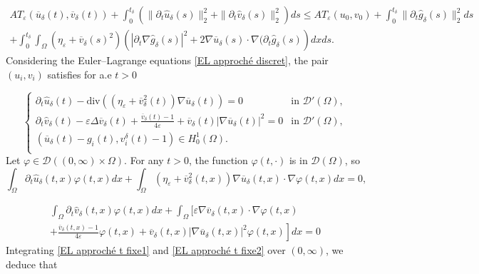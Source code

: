 \documentclass[reqno,12pt,twoside]{amsart}
\numberwithin{equation}{section} \numberwithin{theorem}{section}
\numberwithin{proposition}{section} \numberwithin{lemma}{section}
\numberwithin{corollary}{section}
\numberwithin{definition}{section} \numberwithin{remark}{section}
\begin{document}
\begin{multline}\label{energy bound continue}
AT_\varepsilon (\overline{u}_\delta (t) , \overline{v}_\delta (t)) + \int_0^{t_\delta} \left(\|\partial_t \hat{u}_\delta(s)\|_2^2 + \|\partial_t \hat{v}_\delta(s)\|_2^2 \right)ds 
\leqslant AT_\varepsilon (u_0 , v_0) + \int_0^{t_\delta} \|\partial_t \hat{g}_\delta (s)\|_2^2 ds\\
+ \int_0^{t_\delta}\int_\Omega (\eta_\varepsilon + \overline{v}_\delta(s)^2)\left(|\partial_t \nabla \hat{g}_\delta (s)|^2 + 2 \nabla \overline{u}_\delta (s)\cdot \nabla (\partial_t \hat{g}_\delta (s)\right) dx ds.
\end{multline}
Considering the Euler--Lagrange equations \eqref{EL approché discret},  the pair $(u_i, v_i)$ satisfies for a.e $t >0$

\begin{equation}\label{EL approché t fixe}
\left\{\begin{array}{ll}
\partial_t \hat{u}_\delta (t) - \text{div}((\eta_\varepsilon + \overline{v}_\delta^2(t)) \nabla \overline{u}_\delta(t)) = 0 & \text{in } \mathcal{D}'(\Omega),\\
\partial_t \hat{v}_\delta (t) - \varepsilon\Delta \overline{v}_\delta(t) + \frac{\overline{v}_\delta(t) -1}{4\varepsilon} + \overline{v}_\delta(t) |\nabla \overline{u}_\delta(t)|^2 =0 & \text{in } \mathcal{D}'(\Omega),\\
(\overline{u}_\delta(t) - g_i(t), v_i^\delta(t) -1) \in H_0^1(\Omega). &\\
\end{array}\right.
\end{equation}
Let $\varphi\in \mathcal{D}((0,\infty)\times \Omega)$. For any $t >0$, the function $\varphi(t,\cdot)$ is in $\mathcal{D}(\Omega)$, so 
\begin{equation}\label{EL approché t fixe1}
\int_\Omega \partial_t \hat{u}_\delta (t,x)\varphi(t,x)dx +\int_\Omega (\eta_\varepsilon + \overline{v}_\delta^2(t,x)) \nabla \overline{u}_\delta(t,x) \cdot \nabla\varphi(t,x)dx = 0,
\end{equation}

\begin{multline}\label{EL approché t fixe2}
\int_\Omega \partial_t \hat{v}_\delta (t,x) \varphi(t,x)dx +\int_\Omega \bigg[\varepsilon\nabla \overline{v}_\delta(t,x) \cdot \nabla \varphi (t,x)\\
\left. + \frac{\overline{v}_\delta(t,x) -1}{4\varepsilon}\varphi(t,x) + \overline{v}_\delta(t,x) |\nabla \overline{u}_\delta(t,x)|^2 \varphi(t,x)\right]dx =0  
\end{multline}
Integrating \eqref{EL approché t fixe1} and \eqref{EL approché t fixe2} over $(0,\infty)$, we deduce that
\end{document}
